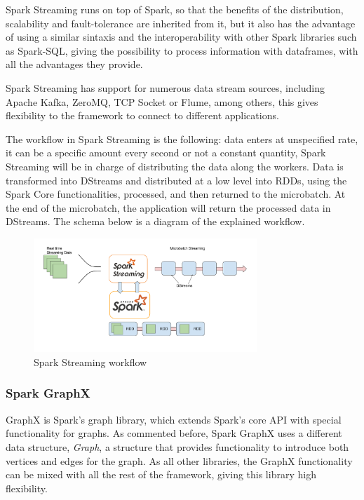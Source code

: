 \documentclass[11pt]{article} %
\begin{document}
          Spark Streaming runs on top of Spark, so that the benefits of the distribution, scalability and fault-tolerance are inherited from it, but it also has the advantage of using a similar sintaxis and the interoperability with other Spark libraries such as Spark-SQL, giving the possibility to process information with dataframes, with all the advantages they provide.

          Spark Streaming has support for numerous data stream sources, including Apache Kafka, ZeroMQ, TCP Socket or Flume, among others, this gives flexibility to the framework to connect to different applications.

          The workflow in Spark Streaming is the following: data enters at unspecified rate, it can be a specific amount every second or not a constant quantity, Spark Streaming will be in charge of distributing the data along the workers. Data is transformed into DStreams and distributed at a low level into RDDs, using the Spark Core functionalities, processed, and then returned to the microbatch. At the end of the microbatch, the application will return the processed data in DStreams. The schema below is a diagram of the explained workflow.

          \begin{figure}[!ht]
            \centering
            \includegraphics[width=0.75\textwidth]{Spark_Streaming_architecture.png}
            \caption{Spark Streaming workflow}
            \label{img:spark_streaming_workflow}
          \end{figure}


        \subsubsection*{Spark GraphX}

          GraphX is Spark's graph library, which extends Spark's core API with special functionality for graphs. As commented before, Spark GraphX uses a different data structure, \emph{Graph}, a structure that provides functionality to introduce both vertices and edges for the graph. As all other libraries, the GraphX functionality can be mixed with all the rest of the framework, giving this library high flexibility.
\end{document}
